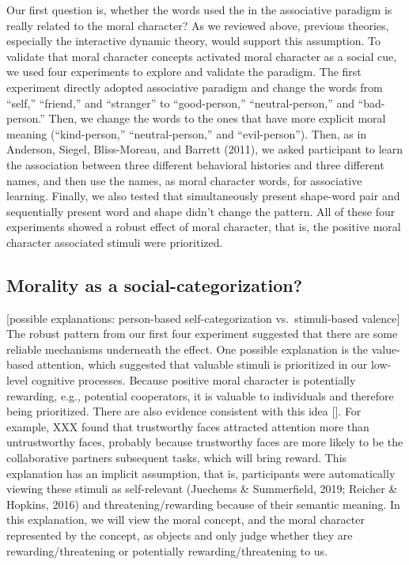 \documentclass[
  english,
  man]{apa6}
\begin{document}
Our first question is, whether the words used the in the associative paradigm is really related to the moral character? As we reviewed above, previous theories, especially the interactive dynamic theory, would support this assumption. To validate that moral character concepts activated moral character as a social cue, we used four experiments to explore and validate the paradigm. The first experiment directly adopted associative paradigm and change the words from ``self,'' ``friend,'' and ``stranger'' to ``good-person,'' ``neutral-person,'' and ``bad-person.'' Then, we change the words to the ones that have more explicit moral meaning (``kind-person,'' ``neutral-person,'' and ``evil-person''). Then, as in Anderson, Siegel, Bliss-Moreau, and Barrett (2011), we asked participant to learn the association between three different behavioral histories and three different names, and then use the names, as moral character words, for associative learning. Finally, we also tested that simultaneously present shape-word pair and sequentially present word and shape didn't change the pattern. All of these four experiments showed a robust effect of moral character, that is, the positive moral character associated stimuli were prioritized.

\hypertarget{morality-as-a-social-categorization}{%
\subsection{Morality as a social-categorization?}\label{morality-as-a-social-categorization}}

{[}possible explanations: person-based self-categorization vs.~stimuli-based valence{]} The robust pattern from our first four experiment suggested that there are some reliable mechanisms underneath the effect. One possible explanation is the value-based attention, which suggested that valuable stimuli is prioritized in our low-level cognitive processes. Because positive moral character is potentially rewarding, e.g., potential cooperators, it is valuable to individuals and therefore being prioritized. There are also evidence consistent with this idea {[}{]}. For example, XXX found that trustworthy faces attracted attention more than untrustworthy faces, probably because trustworthy faces are more likely to be the collaborative partners subsequent tasks, which will bring reward. This explanation has an implicit assumption, that is, participants were automatically viewing these stimuli as self-relevant (Juechems \& Summerfield, 2019; Reicher \& Hopkins, 2016) and threatening/rewarding because of their semantic meaning. In this explanation, we will view the moral concept, and the moral character represented by the concept, as objects and only judge whether they are rewarding/threatening or potentially rewarding/threatening to us.
\end{document}
